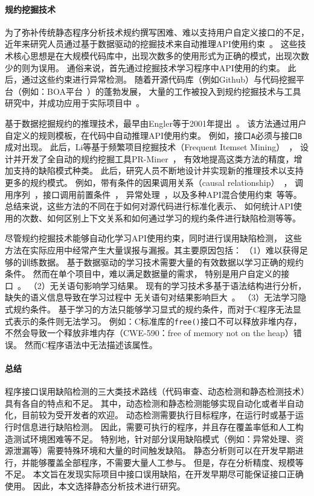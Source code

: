 \paragraph{规约挖掘技术}
为了弥补传统静态程序分析技术规约撰写困难、难以支持用户自定义接口的不足，
近年来研究人员通过基于数据驱动的挖掘技术来自动推理API使用约束~\cite{13survey}。
这些技术核心思想是在大规模代码库中，出现次数多的使用形式为正确的模式，出现次数少的则为误用。
通俗来说，首先通过挖掘技术学习程序中API使用的约束。
此后，通过这些约束进行异常检测。
随着开源代码库（例如Github）与代码挖掘平台（例如：BOA平台~\cite{15-tosem-boa}）的蓬勃发展，
大量的工作被投入到规约挖掘技术与工具研究中，并成功应用于实际项目中~\cite{survey18}。

基于数据挖掘规约的推理技术，最早由Engler等于2001年提出~\cite{01-sosp-mining}。
该方法通过用户自定义的规则模板，在代码中自动推理API使用约束。
例如，接口\texttt{A}必须与接口\texttt{B}成对出现。
此后，Li等基于频繁项目挖掘技术（Frequent Itemset Mining）~\cite{03-fimi-frequent}，
设计并开发了全自动的规约挖掘工具PR-Miner~\cite{05-fse-prminer}，
有效地提高这类方法的精度，增加支持的缺陷模式种类。
此后，研究人员不断地设计并实现新的推理技术以支持更多的规约模式。
例如，带有条件的因果调用关系（causal relationship）~\cite{07-fse-temporal}，
调用序列~\cite{09-ase-sequence}，接口调用前置条件~\cite{14-fse-pre}，
异常处理~\cite{16-ase-apex}，以及多种API混合使用约束~\cite{16-sec-apisan}等等。
总结来说，这些方法的不同在于如何对源代码进行标准化表示、
如何统计API使用的次数、如何区别上下文关系和如何通过学习的规约条件进行缺陷检测等等。

尽管规约挖掘技术能够自动化学习API使用约束，同时进行误用缺陷检测，
这些方法在实际应用中经常产生大量误报与漏报。其主要原因包括：
（1）难以获得足够的训练数据。
基于数据驱动的学习技术需要大量的有效数据以学习正确的规约条件。
然而在单个项目中，难以满足数据量的需求，
特别是用户自定义的接口~\cite{15-kernel-sv,survey18}。
（2）无关语句影响学习结果。
现有的学习技术多基于语法结构进行分析，缺失的语义信息导致在学习过程中
无关语句对结果影响巨大~\cite{16-icse-antminer}。
（3）无法学习隐式规约条件。
基于学习的方法只能够学习显式的规约条件，而对于C程序无法显式表示的条件则无法学习。
例如：C标准库的\texttt{free()}接口不可以释放非堆内存，不然会导致一个释放非堆内存（CWE-590：free of memory not on the heap）错误。
然而C程序语法中无法描述该属性。

\paragraph{总结}
程序接口误用缺陷检测的三大类技术路线（代码审查、动态检测和静态检测技术）具有各自的特点和不足。
其中，动态检测和静态检测能够实现自动化或者半自动化，目前较为受开发者的欢迎。
动态检测需要执行目标程序，在运行时或基于运行时信息进行缺陷检测。
因此，需要可执行的程序，并且存在覆盖率低和人工构造测试环境困难等不足。
特别地，针对部分误用缺陷模式（例如：异常处理、资源泄漏等）需要特殊环境和大量的时间触发缺陷。
静态分析则可以在开发早期进行，并能够覆盖全部程序，不需要大量人工参与。
但是，存在分析精度、规模等不足。
本文旨在发现实际项目中接口误用缺陷，在开发早期尽可能保证接口正确使用。
因此，本文选择静态分析技术进行研究。



